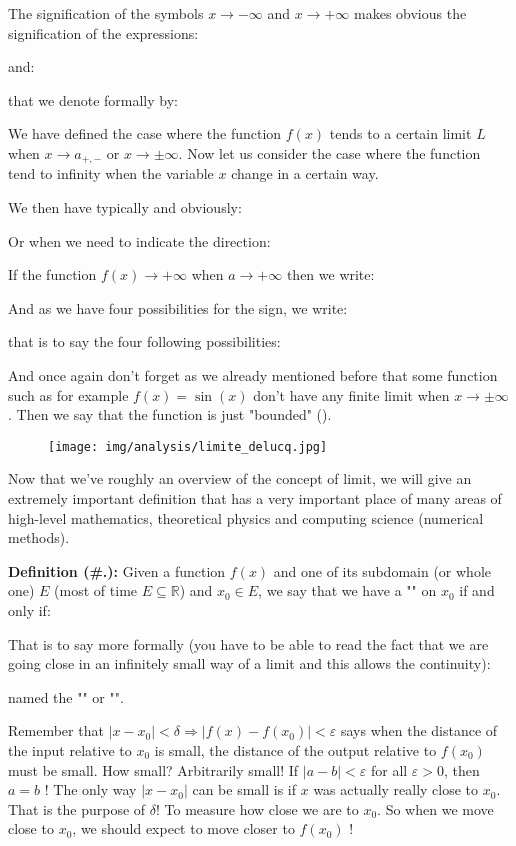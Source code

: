 	The signification of the symbols $x\rightarrow -\infty$ and $x\rightarrow +\infty$ makes obvious the signification of the expressions:
	
	and:
	
	that we denote formally by:	
	
	We have defined the case where the function $f(x)$ tends to a certain limit $L$ when $x\rightarrow a_{+,-}$ or $x\rightarrow \pm \infty$. Now let us consider the case where the function tend to infinity when the variable $x$ change in a certain way.
	
	We then have typically and obviously:
	
	Or when we need to indicate the direction:
	
	If the function $f(x) \rightarrow +\infty$ when $a \rightarrow +\infty$ then we write:
	
	And as we have four possibilities for the sign, we write:
	
	that is to say the four following possibilities:
	
	And once again don't forget as we already mentioned before that some function such as for example $f(x)=\sin(x)$ don't have any finite limit when $x\rightarrow \pm \infty$. Then we say that the function is just "bounded" ().
	\begin{figure}[H]
		\centering
		\texttt{[image: img/analysis/limite\_delucq.jpg]}
	\end{figure}
	Now that we've roughly an overview of the concept of limit, we will give an extremely important definition that has a very important place of many areas of high-level mathematics, theoretical physics and computing science (numerical methods). 
	
	\textbf{Definition (\#\thesection.\mydef):} Given a function $f(x)$ and one of its subdomain (or whole one) $E$ (most of time $E \subseteq \mathbb{R}$) and $x_0\in E$, we say that we have a "" on $x_0$ if and only if:
	
	That is to say more formally (you have to be able to read the fact that we are going close in an infinitely small way of a limit and this allows the continuity):
	
	named the "" or "".
	
	Remember that $|x-x_0|<\delta \Rightarrow |f(x)-f(x_0)|<\varepsilon$ says when the distance of the input relative to $x_0$ is small, the distance of the output relative to $f\left(x_0\right)$ must be small. How small? Arbitrarily small! If $|a-b|<\varepsilon$ for all $\varepsilon>0$, then $a=b$ ! The only way $\left|x-x_0\right|$ can be small is if $x$ was actually really close to $x_0$. That is the purpose of $\delta$! To measure how close we are to $x_0$. So when we move close to $x_0$, we should expect to move closer to $f\left(x_0\right)$ !
	
